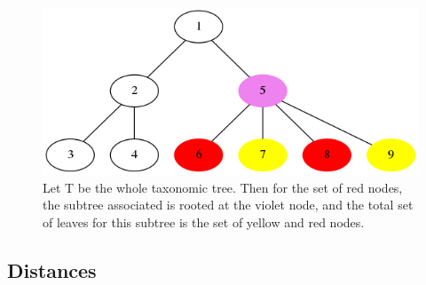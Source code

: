 \documentclass{report}
\begin{document}
\begin{figure}[H]
\centering
\includegraphics[scale=0.3]{illustrations/timili.png}
\caption{Let T be the whole taxonomic tree. Then for the set of red nodes, the subtree associated is rooted at the violet node, and the total set of leaves for this subtree is the set of yellow and red nodes.}
\end{figure}

\subsection{Distances}
\end{document}
